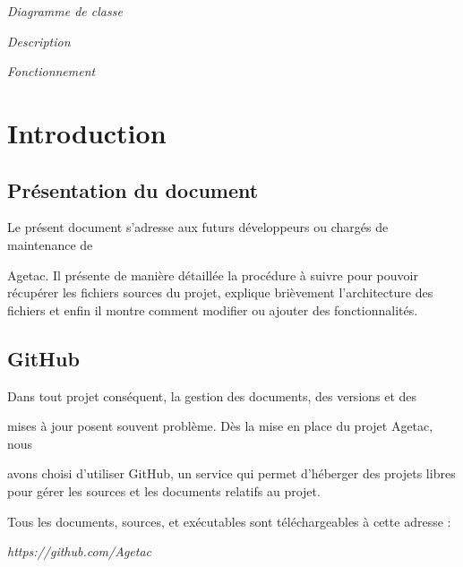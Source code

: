 \documentclass{article}
\begin{document}
\leftskip=54pt
{\color{color03} \emph{Diagramme de classe}}

{\color{color03} \emph{Description}}

\leftskip=18pt
{\color{color03} \emph{Fonctionnement\label{h.llgn2xg50s04}\label{h.th5huzux8wvr}}}

\vspace{272pt}
\section*{{\LARGE {\color{color01} \textbf{Introduction\label{h.c625vjascgkw}}}}}

\vspace{18pt}
\subsection*{{\large {\color{color01} \textbf{Présentation du document}}}}

\leftskip=0pt
{\color{color01} Le présent document s'adresse aux futurs développeurs ou chargés 
de maintenance de}

{\color{color01} Agetac. Il présente de manière détaillée la procédure à 
suivre pour pouvoir récupérer les fichiers sources du projet, explique brièvement 
l'architecture des fichiers et enfin il montre comment modifier ou ajouter des 
fonctionnalités.\label{h.htfanscfvw9j}}

\vspace{31pt}
\subsection*{{\large {\color{color01} \textbf{GitHub}}}}

{\color{color01} Dans tout projet conséquent, la gestion des documents, des versions 
et des}

{\color{color01} mises à jour posent souvent problème. Dès la mise en place 
du projet Agetac, nous}

{\color{color01} avons choisi d'utiliser GitHub, un service qui permet d'héberger 
des projets libres pour gérer les sources et les documents relatifs au projet.}

\vspace{13pt}
{\color{color01} Tous les documents, sources, et exécutables sont téléchargeables 
à cette adresse : }

{\color{color03} \emph{https://github.com/Agetac\label{h.3j9knedtu23x}}}

\vspace{24pt}
\end{document}
